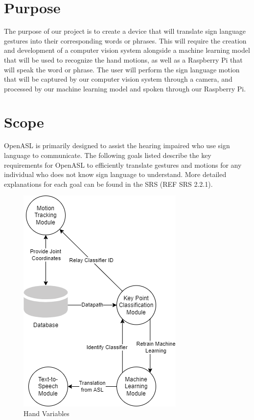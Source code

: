 \documentclass[12pt, titlepage]{article}
\begin{document}
\section{Purpose}
The purpose of our project is to create a device that will translate sign language gestures into their corresponding words 
or phrases. This will require the creation and development of a computer vision system alongside a machine learning model that 
will be used to recognize the hand motions, as well as a Raspberry Pi that will speak the word or phrase. The user will perform 
the sign language motion that will be captured by our computer vision system through a camera, and processed by our machine learning 
model and spoken through our Raspberry Pi.


\section{Scope}
OpenASL is primarily designed to assist the hearing impaired who use sign language to communicate. The following goals listed 
describe the key requirements for OpenASL to efficiently translate gestures and motions for any individual who does not know sign language 
to understand. More detailed explanations for each goal can be found in the SRS (REF SRS 2.2.1).

\begin{figure}[H] 
\centering
\includegraphics[width=\textwidth,height=0.88\textheight,keepaspectratio,scale=0.75]{SystemContextDiagram.jpg} 
\caption{Hand Variables} 
\label{Fig.System_Context_Diagram} 
\end{figure}
\end{document}
